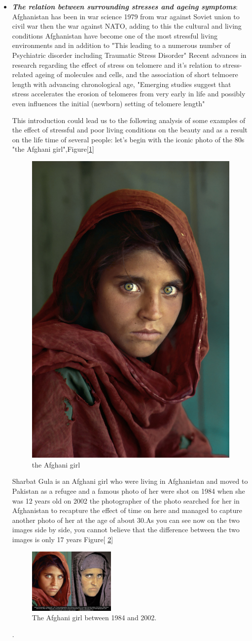 \documentclass[12pt]{article}
\theoremstyle{plain}
\theoremstyle{definition}
\theoremstyle{remark}
\begin{document}
\begin{itemize}
\item \textit{ \textbf{The relation between surrounding stresses and ageing symptoms}}:
Afghanistan has been in war science 1979 from war against Soviet union to civil war then the war against NATO, adding to this the cultural and living conditions Afghanistan have become one of the most stressful living environments and in addition to "This leading to a numerous number of Psychiatric disorder including Traumatic Stress Disorder" \cite{wardak1993psychiatric} Recent advances in research regarding the effect of stress on telomere and it's relation to stress-related ageing of molecules and cells, and the association of short telmoere length  with advancing chronological age, "Emerging studies suggest that stress accelerates the erosion of telomeres from very early in life and possibly even influences the initial (newborn) setting of telomere length" \cite{shalev2013stress} 

This introduction could lead us to the following analysis of some examples of the effect of stressful and poor living conditions on the beauty and as a result on the life time of several people:
let's begin with the iconic photo of the 80s "the Afghani girl",Figure[\ref{fig:afghanigirl}]
\begin{figure}[hbtp]
	 \centerline{\includegraphics[width=.2 \textwidth]{1.jpg}}
	 {\caption{the Afghani girl}\label{fig:afghanigirl}}
\end{figure}

 Sharbat Gula is an Afghani girl who were living in Afghanistan and moved to Pakistan as a refugee and a famous photo of her were shot on 1984 when she was 12 years old on 2002 the photographer of the photo searched for her in Afghanistan to recapture the effect of time on here and managed to capture another photo of her at the age of about 30.As you can see now on the two images side by side, you cannot believe that  the difference between the two images is only 17 years Figure[ \ref{fig:afghanigirl17years}]
\begin{figure}[hbtp]
	 \centerline{\includegraphics[width=0.4\textwidth]{2.jpg}}
	 {\caption{The Afghani girl between 1984 and 2002.}\label{fig:afghanigirl17years}}
\end{figure}.


\end{itemize}
\end{document}
